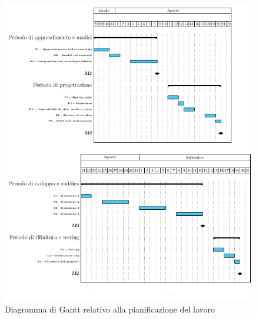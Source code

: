\begin{figure}[htpd]
\centering
\includegraphics[width=\textwidth]{../immagini/gantt}
\caption{Diagramma di Gantt relativo alla pianificazione del lavoro}  
\end{figure}

